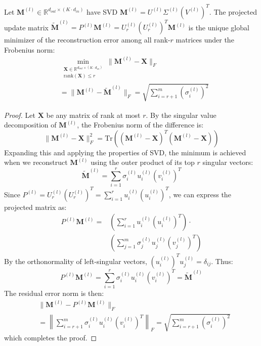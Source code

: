 \begin{theorem}
Let $\mathbf{M}^{(l)} \in \mathbb{R}^{d_{out} \times (K \cdot d_{in})}$ have SVD $\mathbf{M}^{(l)} = U^{(l)} \Sigma^{(l)} (V^{(l)})^T$. The projected update matrix $\tilde{\mathbf{M}}^{(l)} = P^{(l)} \mathbf{M}^{(l)} = U_r^{(l)} (U_r^{(l)})^T \mathbf{M}^{(l)}$ is the unique global minimizer of the reconstruction error among all rank-$r$ matrices under the Frobenius norm:
\begin{equation}
\begin{split}
    &\min_{\substack{\mathbf{X} \in \mathbb{R}^{d_{out} \times (K \cdot d_{in})} \\ \text{rank}(\mathbf{X}) \le r}} \|\mathbf{M}^{(l)} - \mathbf{X}\|_F \\
    &= \|\mathbf{M}^{(l)} - \tilde{\mathbf{M}}^{(l)}\|_F = \sqrt{\sum_{i=r+1}^{m} (\sigma_i^{(l)})^2}
\end{split}
\end{equation}
\end{theorem}

\begin{proof}
Let $\mathbf{X}$ be any matrix of rank at most $r$. By the singular value decomposition of $\mathbf{M}^{(l)}$, the Frobenius norm of the difference is:
\begin{equation}
    \|\mathbf{M}^{(l)} - \mathbf{X}\|_F^2 = \text{Tr}\left((\mathbf{M}^{(l)} - \mathbf{X})^T (\mathbf{M}^{(l)} - \mathbf{X})\right)
\end{equation}
Expanding this and applying the properties of SVD, the minimum is achieved when we reconstruct $\mathbf{M}^{(l)}$ using the outer product of its top $r$ singular vectors:
\begin{equation}
    \tilde{\mathbf{M}}^{(l)} = \sum_{i=1}^r \sigma_i^{(l)} u_i^{(l)} (v_i^{(l)})^T
\end{equation}
Since $P^{(l)} = U_r^{(l)} (U_r^{(l)})^T = \sum_{i=1}^r u_i^{(l)} (u_i^{(l)})^T$, we can express the projected matrix as:
\begin{equation}
\begin{split}
    P^{(l)} \mathbf{M}^{(l)} = &\left(\sum_{i=1}^r u_i^{(l)} (u_i^{(l)})^T\right) \cdot \\
    &\left(\sum_{j=1}^{m} \sigma_j^{(l)} u_j^{(l)} (v_j^{(l)})^T\right)
\end{split}
\end{equation}
By the orthonormality of left-singular vectors, $(u_i^{(l)})^T u_j^{(l)} = \delta_{ij}$. Thus:
\begin{equation}
    P^{(l)} \mathbf{M}^{(l)} = \sum_{i=1}^r \sigma_i^{(l)} u_i^{(l)} (v_i^{(l)})^T = \tilde{\mathbf{M}}^{(l)}
\end{equation}
The residual error norm is then:
\begin{equation}
\begin{split}
    &\|\mathbf{M}^{(l)} - P^{(l)} \mathbf{M}^{(l)}\|_F \\
    &= \left\|\sum_{i=r+1}^{m} \sigma_i^{(l)} u_i^{(l)} (v_i^{(l)})^T\right\|_F = \sqrt{\sum_{i=r+1}^{m} (\sigma_i^{(l)})^2}
\end{split}
\end{equation}
which completes the proof.
\end{proof}

